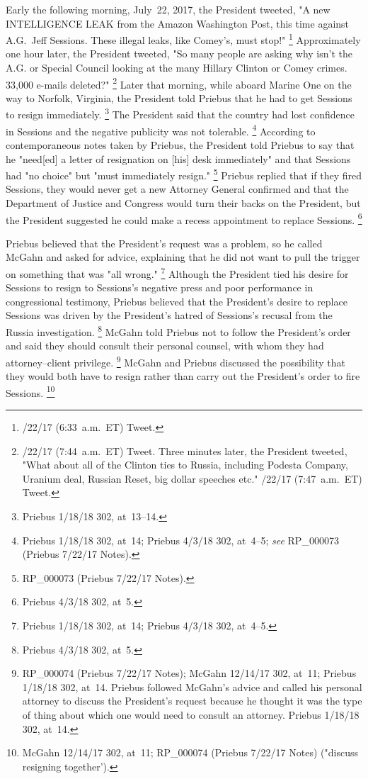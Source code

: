 Early the following morning, July~22, 2017, the President tweeted, "A new INTELLIGENCE LEAK from the Amazon Washington Post, this time against A.G.~Jeff Sessions.
These illegal leaks, like Comey's, must stop!"%
\footnote{/22/17 (6:33~a.m.~ET) Tweet.}
Approximately one hour later, the President tweeted, "So many people are asking why isn't the A.G. or Special Council looking at the many Hillary Clinton or Comey crimes.
33,000 e-mails deleted?"%
\footnote{/22/17 (7:44~a.m.~ET) Tweet.
Three minutes later, the President tweeted, "What about all of the Clinton ties to Russia, including Podesta Company, Uranium deal, Russian Reset, big dollar speeches etc."
/22/17 (7:47~a.m.~ET) Tweet.}
Later that morning, while aboard Marine One on the way to Norfolk, Virginia, the President told Priebus that he had to get Sessions to resign immediately.%
\footnote{Priebus 1/18/18 302, at~13--14.}
The President said that the country had lost confidence in Sessions and the negative publicity was not tolerable.%
\footnote{Priebus 1/18/18 302, at~14;
Priebus 4/3/18 302, at~4--5;
\textit{see} RP\_000073 (Priebus 7/22/17 Notes).}
According to contemporaneous notes taken by Priebus, the President told Priebus to say that he "need[ed] a letter of resignation on [his] desk immediately" and that Sessions had "no choice" but "must immediately resign."%
\footnote{RP\_000073 (Priebus 7/22/17 Notes).}
Priebus replied that if they fired Sessions, they would never get a new Attorney General confirmed and that the Department of Justice and Congress would turn their backs on the President, but the President suggested he could make a recess appointment to replace Sessions.%
\footnote{Priebus 4/3/18 302, at~5.}

Priebus believed that the President's request was a problem, so he called McGahn and asked for advice, explaining that he did not want to pull the trigger on something that was "all wrong."%
\footnote{Priebus 1/18/18 302, at~14;
Priebus 4/3/18 302, at~4--5.}
Although the President tied his desire for Sessions to resign to Sessions's negative press and poor performance in congressional testimony, Priebus believed that the President's desire to replace Sessions was driven by the President's hatred of Sessions's recusal from the Russia investigation.%
\footnote{Priebus 4/3/18 302, at~5.}
McGahn told Priebus not to follow the President's order and said they should consult their personal counsel, with whom they had attorney--client privilege.%
\footnote{RP\_000074 (Priebus 7/22/17 Notes);
McGahn 12/14/17 302, at~11;
Priebus 1/18/18 302, at~14.
Priebus followed McGahn's advice and called his personal attorney to discuss the President's request because he thought it was the type of thing about which one would need to consult an attorney.
Priebus 1/18/18 302, at~14.}
McGahn and Priebus discussed the possibility that they would both have to resign rather than carry out the President's order to fire Sessions.%
\footnote{McGahn 12/14/17 302, at~11;
RP\_000074 (Priebus 7/22/17 Notes) ("discuss resigning together').}

